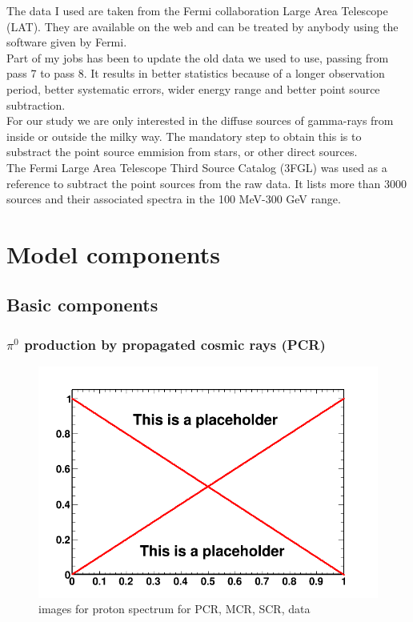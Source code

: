 The data I used are taken from the Fermi collaboration Large Area Telescope (LAT). They are available on the web and can be treated by anybody using the software given by Fermi.\\

Part of my jobs has been to update the old data we used to use, passing from pass 7 to pass 8. It results in better statistics because of a longer observation period, better systematic errors, wider energy range and better point source subtraction.\\

For our study we are only interested in the diffuse sources of gamma-rays from inside or outside the milky way. The mandatory step to obtain this is to substract the point source emmision from stars, or other direct sources.\\

The Fermi Large Area Telescope Third Source Catalog (3FGL) was used as a reference to subtract the point sources from the raw data. It lists more than 3000 sources and their associated spectra in the 100 MeV-300 GeV range.\\



\section{Model components}
\subsection{Basic components}

\subsubsection{$\pi^0$ production by propagated cosmic rays (PCR)}

\begin{figure}
 \centering
 \includegraphics[width=.9\linewidth]{pic/dummy.png}
 \caption{images for proton spectrum for PCR, MCR, SCR, data}
 \label{fig:proton_spec}
\end{figure}

